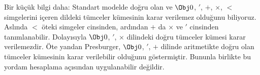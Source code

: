 Bir küçük bilgi daha: Standart modelde doğru olan ve $\Obj 0$, $'$, $+$,
$\times$, $<$ simgelerini içeren dildeki tümceler kümesinin karar verilemez
olduğunu biliyoruz. Aslında $<$ öteki simgeler cinsinden, ardından $+$ da
$\times$ ve $'$ cinsinden tanımlanabilir. Dolayısıyla $\Obj 0$, $'$,
$\times$ dilindeki doğru tümceler kümesi karar verilemezdir. Öte yandan
Presburger, $\Obj 0$, $'$, $+$ dilinde aritmetikte doğru olan tümceler
kümesinin karar verilebilir olduğunu göstermiştir. Bununla birlikte bu
yordam hesaplama açısından uygulanabilir değildir.

